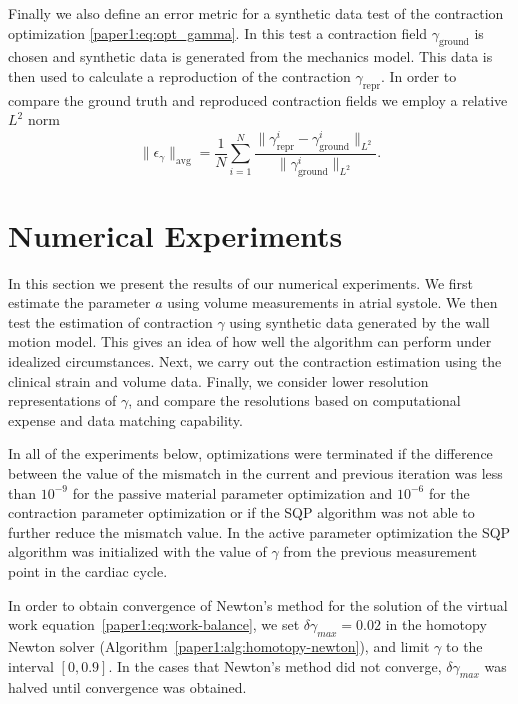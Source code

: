 Finally we also define an error metric for a synthetic
data test of the contraction optimization \eqref{paper1:eq:opt_gamma}. In this
test a contraction field $\gamma_{\text{ground}}$ is chosen and 
synthetic data is generated from the 
mechanics model. This data is then used to calculate a
reproduction of the contraction $\gamma_{\text{repr}}$. 
In order to compare the ground truth and reproduced contraction 
fields we employ a relative $L^2$ norm
\begin{equation}
  \| \epsilon_{\gamma} \|_{\text{avg}} = \frac{1}{N} \sum_{i = 1}^{N}  \frac{\| \gamma_{\text{repr}}^{i} -
  \gamma_{\text{ground}}^{i} \|_{L^2}}{ \| \gamma_{\text{ground}}^{i} \|_{L^2}}.
\label{paper1:eq:error_gamma}
\end{equation}

\section{Numerical Experiments}
\label{paper1:sec:num_results}
In this section we present the results of our numerical experiments.
We first estimate the parameter $a$ using volume measurements in atrial systole.
We then test the estimation of contraction $\gamma$ using synthetic data generated
by the wall motion model. This gives an idea of how well the algorithm
can perform under idealized circumstances.  Next, we
carry out the contraction estimation using the clinical strain and volume data.
Finally, we consider lower resolution representations of $\gamma$, and compare 
the resolutions based on computational expense and data matching capability.

In all of the experiments below, optimizations were terminated if the
difference between the value of the mismatch in the current and
previous iteration was less than $10^{-9}$ for the passive material
parameter optimization and $10^{-6}$ for the contraction
parameter optimization or if the
SQP algorithm was not able to further reduce the mismatch value.
In the active parameter optimization the SQP
algorithm was initialized with the value of $\gamma$ from the previous
measurement point in the cardiac cycle. 

In order to obtain convergence of Newton's method for the solution of
the virtual work equation~\eqref{paper1:eq:work-balance}, we set $\delta
\gamma_{max} = 0.02$ in the homotopy Newton solver
(Algorithm~\ref{paper1:alg:homotopy-newton}), and 
limit $\gamma$ to the interval $[0, 0.9]$. In the cases that Newton's
method did not converge, $\delta \gamma_{max}$ was halved until convergence was obtained. 

